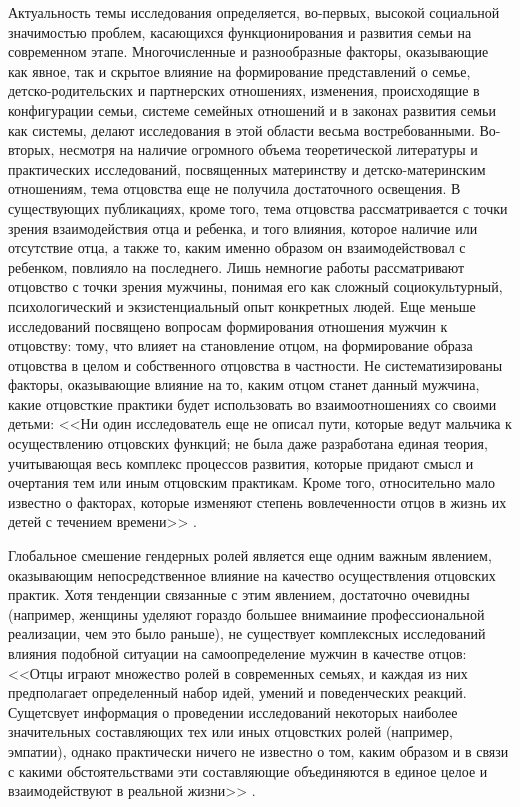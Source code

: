 \documentclass{../../common/thesisbyxetex}
\begin{document}
Актуальность темы исследования определяется, во-первых, высокой социальной значимостью проблем,
касающихся функционирования и развития семьи на современном этапе. Многочисленные и разнообразные
факторы, оказывающие как явное, так и скрытое влияние на формирование представлений о семье,
детско-родительских и партнерских отношениях, изменения, происходящие в конфигурации семьи, системе
семейных отношений и в законах развития семьи как системы, делают исследования в этой области
весьма востребованными. Во-вторых, несмотря на наличие огромного объема теоретической литературы и
практических исследований, посвященных материнству и детско-материнским отношениям, тема отцовства
еще не получила достаточного освещения. В существующих публикациях, кроме того, тема отцовства
рассматривается с точки зрения взаимодействия отца и ребенка, и того влияния, которое наличие
или отсутствие отца, а также то, каким именно образом он взаимодействовал с ребенком, повлияло на
последнего. Лишь немногие работы рассматривают отцовство с точки зрения мужчины,
понимая его как сложный социокультурный, психологический и экзистенциальный опыт конкретных людей.
Еще меньше исследований посвящено вопросам формирования отношения мужчин к отцовству:
тому, что влияет на становление отцом, на формирование образа отцовства в целом и собственного
отцовства в частности. Не систематизированы факторы, оказывающие влияние на то, каким отцом станет
данный мужчина, какие отцовсткие практики будет использовать во взаимоотношениях со своими детьми:
<<Ни один исследователь еще не описал пути, которые ведут мальчика к осуществлению отцовских
функций; не была даже разработана единая теория, учитывающая весь комплекс процессов развития,
которые придают смысл и очертания тем или иным отцовским практикам. Кроме того, относительно мало
известно о факторах, которые изменяют степень вовлеченности отцов в жизнь их детей с течением
времени>>  \cite[131]{f21}.

Глобальное смешение гендерных ролей является еще одним важным явлением, оказывающим
непосредственное влияние на качество осуществления отцовских практик. Хотя тенденции связанные
с этим явлением, достаточно очевидны (например, женщины уделяют гораздо большее внимаиние
профессиональной реализации, чем это было раньше), не существует комплексных исследований
влияния подобной ситуации на самоопределение мужчин в качестве отцов: <<Отцы играют множество
ролей в современных семьях, и каждая из них предполагает определенный набор идей, умений и
поведенческих реакций. Сущетсвует информация о проведении исследований некоторых наиболее
значительных составляющих тех или иных отцовстких ролей (например, эмпатии), однако
практически ничего не известно о том, каким образом и в связи с какими обстоятельствами эти
составляющие объединяются в единое целое и взаимодействуют в реальной жизни>>
 \cite[131]{f21}.
\end{document}
